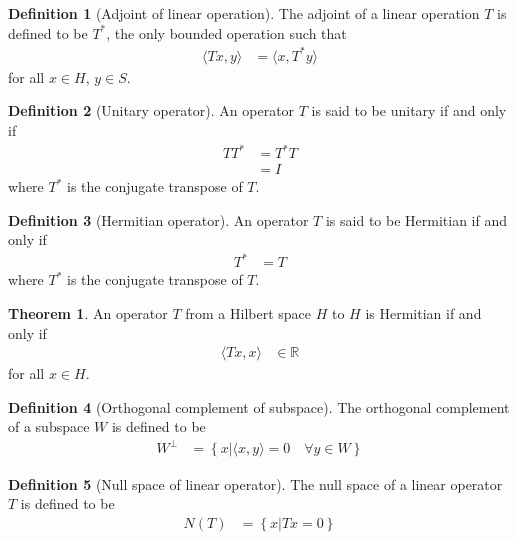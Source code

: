\documentclass[titlepage, fleqn, a4paper, 12pt, twoside]{article}
\theoremstyle{definition}
\newtheorem{definition}{Definition}
\theoremstyle{theorem}
\newtheorem{theorem}{Theorem}
\begin{document}
\begin{definition}[Adjoint of linear operation]
	The adjoint of a linear operation $T$ is defined to be $T^*$, the only bounded operation such that
	\begin{align*}
		\langle T x , y \rangle &= \langle x , T^* y \rangle
	\end{align*}
	for all $x \in H$, $y \in S$.\\
\end{definition}

\begin{definition}[Unitary operator]
	An operator $T$ is said to be unitary if and only if
	\begin{align*}
		T T^* &= T^* T\\
		&= I
	\end{align*}
	where $T^*$ is the conjugate transpose of $T$.
\end{definition}

\begin{definition}[Hermitian operator]
	An operator $T$ is said to be Hermitian if and only if
	\begin{align*}
		T^* &= T
	\end{align*}
	where $T^*$ is the conjugate transpose of $T$.
\end{definition}

\begin{theorem}
	An operator $T$ from a Hilbert space $H$ to $H$ is Hermitian if and only if
	\begin{align*}
		\langle T x , x \rangle &\in \mathbb{R}
	\end{align*}
	for all $x \in H$.
\end{theorem}

\begin{definition}[Orthogonal complement of subspace]
	The orthogonal complement of a subspace $W$ is defined to be
	\begin{align*}
		W^{\perp} &= \left\{ x \Big| \langle x,y \rangle = 0 \quad \forall y \in W \right\}
	\end{align*}
\end{definition}

\begin{definition}[Null space of linear operator]
	The null space of a linear operator $T$ is defined to be
	\begin{align*}
		N(T) &= \left\{ x \Big| T x = 0 \right\}
	\end{align*}
\end{definition}
\end{document}
